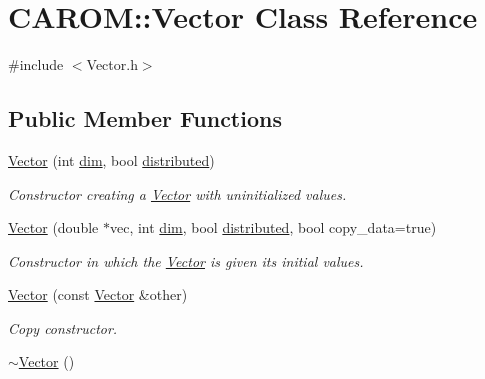 \hypertarget{class_c_a_r_o_m_1_1_vector}{\section{C\-A\-R\-O\-M\-:\-:Vector Class Reference}
\label{class_c_a_r_o_m_1_1_vector}
}


{\ttfamily \#include $<$Vector.\-h$>$}

\subsection*{Public Member Functions}
\begin{DoxyCompactItemize}
\item 
\hyperlink{class_c_a_r_o_m_1_1_vector_ae53700bee43331520ebed2e2ce99de4d}{Vector} (int \hyperlink{class_c_a_r_o_m_1_1_vector_a8f8e5d44c3f2cd12e2f4090ddf97c735}{dim}, bool \hyperlink{class_c_a_r_o_m_1_1_vector_a0fe8ff4dfdb1357d1bb67f7945491841}{distributed})
\begin{DoxyCompactList}\small\item\em Constructor creating a \hyperlink{class_c_a_r_o_m_1_1_vector}{Vector} with uninitialized values. \end{DoxyCompactList}\item 
\hyperlink{class_c_a_r_o_m_1_1_vector_a8ba1699eeade04af7ac0a9f5c2741032}{Vector} (double $\ast$vec, int \hyperlink{class_c_a_r_o_m_1_1_vector_a8f8e5d44c3f2cd12e2f4090ddf97c735}{dim}, bool \hyperlink{class_c_a_r_o_m_1_1_vector_a0fe8ff4dfdb1357d1bb67f7945491841}{distributed}, bool copy\-\_\-data=true)
\begin{DoxyCompactList}\small\item\em Constructor in which the \hyperlink{class_c_a_r_o_m_1_1_vector}{Vector} is given its initial values. \end{DoxyCompactList}\item 
\hyperlink{class_c_a_r_o_m_1_1_vector_ae7d43c02949ee04a914d6ca540485b3c}{Vector} (const \hyperlink{class_c_a_r_o_m_1_1_vector}{Vector} \&other)
\begin{DoxyCompactList}\small\item\em Copy constructor. \end{DoxyCompactList}\item 
\hypertarget{class_c_a_r_o_m_1_1_vector_aa751475ec55bc679c7e874b0b442f59f}{\hyperlink{class_c_a_r_o_m_1_1_vector_aa751475ec55bc679c7e874b0b442f59f}{$\sim$\-Vector} ()}\label{class_c_a_r_o_m_1_1_vector_aa751475ec55bc679c7e874b0b442f59f}


\end{DoxyCompactItemize}
